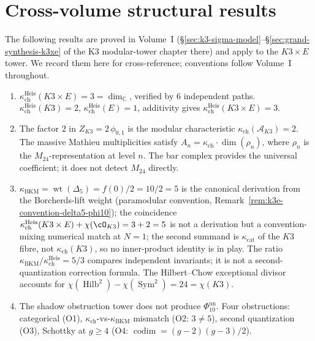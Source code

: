 \section{Cross-volume structural results}
\label{sec:k3e-cross-volume}

The following results are proved in Volume~I
(\S\ref{sec:k3-sigma-model}--\S\ref{sec:grand-synthesis-k3xe}
of the K3 modular-tower chapter there) and apply to the $K3 \times E$ tower.
We record them here for cross-reference; conventions
follow Volume~I throughout.

\begin{enumerate}[label=\textup{(K3-\arabic*)}]
\item $\kappa_{\mathrm{ch}}^{\mathrm{Heis}}(K3 \times E) = 3 = \dim_\mathbb{C}$, verified by
 $6$ independent paths.
 $\kappa_{\mathrm{ch}}^{\mathrm{Heis}}(K3) = 2$, $\kappa_{\mathrm{ch}}^{\mathrm{Heis}}(E) = 1$, additivity gives
 $\kappa_{\mathrm{ch}}^{\mathrm{Heis}}(K3 \times E) = 3$.

\item The factor $2$ in $Z_{K3} = 2\,\phi_{0,1}$ is the
 modular characteristic $\kappa_{\mathrm{ch}}(\mathcal{A}_{K3}) = 2$.
 The massive Mathieu multiplicities satisfy
 $A_n = \kappa_{\mathrm{ch}} \cdot \dim(\rho_n)$, where $\rho_n$ is the
 $M_{24}$-representation at level $n$. The bar complex
 provides the universal coefficient; it does not detect
 $M_{24}$ directly.

\item $\kappa_{\mathrm{BKM}} = \operatorname{wt}(\Delta_5) = f(0)/2 = 10/2 = 5$ is the canonical derivation from the Borcherds-lift weight (paramodular convention, Remark~\ref{rem:k3e-convention-delta5-phi10}); the coincidence $\kappa_{\mathrm{ch}}^{\mathrm{Heis}}(K3 \times E) + \chi(\cO_{K3}) = 3 + 2 = 5$ is not a derivation but a convention-mixing numerical match at $N=1$; the second summand is $\kappa_{\mathrm{cat}}$ of the $K3$ fibre, not $\kappa_{\mathrm{ch}}(K3)$, so no inner-product identity is in play.
 The ratio $\kappa_{\mathrm{BKM}}/\kappa_{\mathrm{ch}}^{\mathrm{Heis}}
 = 5/3$ compares independent invariants; it is not a
 second-quantization correction formula. The Hilbert--Chow
 exceptional divisor accounts for
 $\chi(\operatorname{Hilb}^2) - \chi(\operatorname{Sym}^2)
 = 24 = \chi(K3)$.

\item The shadow obstruction tower does not produce
 \(\Phi_{10}^{\mathrm{un}}\). Four obstructions: categorical (O1),
 $\kappa_{\mathrm{ch}}$-vs-$\kappa_{\mathrm{BKM}}$ mismatch (O2: $3 \neq 5$), second quantization
 (O3), Schottky at $g \geq 4$ (O4:
 $\operatorname{codim} = (g{-}2)(g{-}3)/2$).


\end{enumerate}
